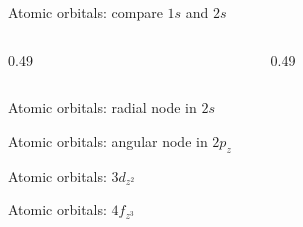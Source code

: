 \documentclass[aspectratio=169]{beamer}
\begin{document}
\begin{frame}{Atomic orbitals: compare $1s$ and $2s$}
  \begin{columns}[c,onlytextwidth]
    \begin{column}{0.49\textwidth}
      \atomicorbital[orbital=1s,width=\linewidth]
    \end{column}
    \begin{column}{0.49\textwidth}
      \atomicorbital[orbital=2s,width=\linewidth]
    \end{column}
  \end{columns}
\end{frame}

\begin{frame}{Atomic orbitals: radial node in $2s$}
  \centering
  \atomicorbital[orbital=2s,width=12cm,height=5.4cm]
\end{frame}

\begin{frame}{Atomic orbitals: angular node in $2p_z$}
  \centering
  \atomicorbital[orbital=2pz,width=12cm,height=5.4cm]
\end{frame}

\begin{frame}{Atomic orbitals: $3d_{z^2}$}
  \centering
  \atomicorbital[orbital=3dz2,width=12cm,height=5.4cm]
\end{frame}

\begin{frame}{Atomic orbitals: $4f_{z^3}$}
  \centering
  \atomicorbital[orbital=4fz(5z2-3r2),width=12cm,height=5.4cm]
\end{frame}
\end{document}
